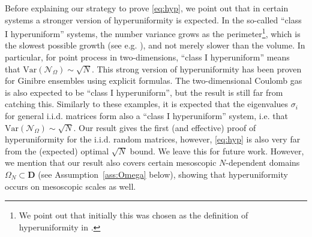 \documentclass[10pt]{amsart}
\numberwithin{equation}{section}
\begin{document}
Before explaining our strategy to prove \eqref{eq:hyp}, we point out that in certain systems a stronger version of hyperuniformity is expected. In the so-called “class I hyperuniform” systems, the number variance grows as the perimeter\footnote{We point out that initially this was chosen as the definition of hyperuniformity in \cite{torquato2003local}.}, which is the slowest possible growth (see e.g. \cite{beck1987irregularities}), and not merely slower than the volume. In particular, for point process in two-dimensions, “class I hyperuniform” means that $\mathrm{Var}(\mathcal{N}_\Omega)\sim \sqrt{N}$. This strong version of hyperuniformity has been proven  for Ginibre ensembles using explicit formulas. The two-dimensional Coulomb gas is  also expected to be “class I hyperuniform”, but the result \cite{leble2021two} is still far from catching this. Similarly to these examples, it is expected that the eigenvalues $\sigma_i$ for general i.i.d. matrices form also a “class I hyperuniform” system, i.e. that $\mathrm{Var}(\mathcal{N}_\Omega)\sim \sqrt{N}$. Our result gives the first (and effective) proof of hyperuniformity for the i.i.d. random matrices, however, \eqref{eq:hyp} is also very far from the (expected) optimal $\sqrt{N}$ bound. We leave this for future work. However, we mention that our result also covers certain mesoscopic $N$-dependent domains $\Omega_N\subset \mathbf{D}$ (see Assumption~\ref{ass:Omega} below), showing  that hyperuniformity occurs on mesoscopic scales as well.
\end{document}
